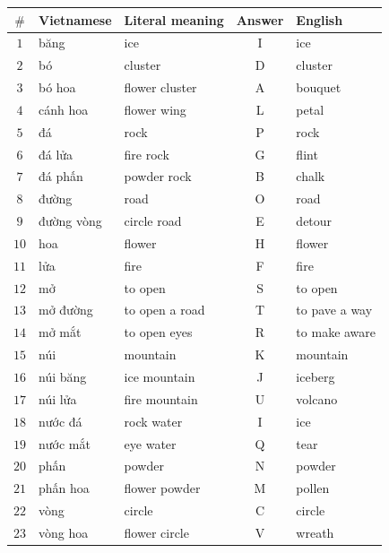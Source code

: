 \begin{center}
	\renewcommand{\arraystretch}{1.2}
	\setlength{\tabcolsep}{8pt}
	\begin{tabular}{|c|l|l|c|l|}
		\hline
		$\#$ & Vietnamese & Literal meaning & Answer & English       \\ \hline
		$1 $ & băng       & ice             & I      & ice           \\ \hline
		$2 $ & bó         & cluster         & D      & cluster       \\ \hline
		$3 $ & bó hoa     & flower cluster  & A      & bouquet       \\ \hline
		$4 $ & cánh hoa   & flower wing     & L      & petal         \\ \hline
		$5 $ & đá         & rock            & P      & rock          \\ \hline
		$6 $ & đá lửa     & fire rock       & G      & flint         \\ \hline
		$7 $ & đá phấn    & powder rock     & B      & chalk         \\ \hline
		$8 $ & đường      & road            & O      & road          \\ \hline
		$9 $ & đường vòng & circle road     & E      & detour        \\ \hline
		$10$ & hoa        & flower          & H      & flower        \\ \hline
		$11$ & lửa        & fire            & F      & fire          \\ \hline
		$12$ & mở         & to open         & S      & to open       \\ \hline
		$13$ & mở đường   & to open a road  & T      & to pave a way \\ \hline
		$14$ & mở mắt     & to open eyes    & R      & to make aware \\ \hline
		$15$ & núi        & mountain        & K      & mountain      \\ \hline
		$16$ & núi băng   & ice mountain    & J      & iceberg       \\ \hline
		$17$ & núi lửa    & fire mountain   & U      & volcano       \\ \hline
		$18$ & nước đá    & rock water      & I      & ice           \\ \hline
		$19$ & nước mắt   & eye water       & Q      & tear          \\ \hline
		$20$ & phấn       & powder          & N      & powder        \\ \hline
		$21$ & phấn hoa   & flower powder   & M      & pollen        \\ \hline
		$22$ & vòng       & circle          & C      & circle        \\ \hline
		$23$ & vòng hoa   & flower circle   & V      & wreath        \\ \hline
	\end{tabular}
\end{center}